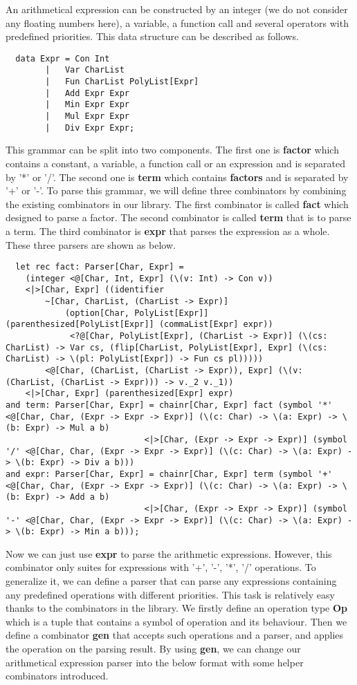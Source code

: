 An arithmetical expression can be constructed by an integer (we do not consider any floating numbers here), a variable, a function call and several operators with predefined priorities. This data structure can be described as follows.
\begin{lstlisting}
  data Expr = Con Int
		|	Var CharList
		|	Fun CharList PolyList[Expr]
		|	Add Expr Expr
		|	Min Expr Expr
		|	Mul Expr Expr
		|	Div Expr Expr;
\end{lstlisting}
This grammar can be split into two components. The first one is \textbf{factor} which contains a constant, a variable, a function call or an expression and is separated by '*' or '/'.  The second one is \textbf{term} which contains \textbf{factors} and is separated by '+' or '-'.
To parse this grammar, we will define three combinators by combining the existing combinators in our library. The first combinator is called \textbf{fact} which designed to parse a factor. The second combinator is called \textbf{term} that is to parse a term. The third combinator is \textbf{expr} that parses the expression as a whole. These three parsers are shown as below.
\begin{lstlisting}
  let rec fact: Parser[Char, Expr] =
	(integer <@[Char, Int, Expr] (\(v: Int) -> Con v))
	<|>[Char, Expr] ((identifier 
		~[Char, CharList, (CharList -> Expr)]
			(option[Char, PolyList[Expr]] (parenthesized[PolyList[Expr]] (commaList[Expr] expr))
			 <?@[Char, PolyList[Expr], (CharList -> Expr)] (\(cs: CharList) -> Var cs, (flip[CharList, PolyList[Expr], Expr] (\(cs: CharList) -> \(pl: PolyList[Expr]) -> Fun cs pl)))))
		<@[Char, (CharList, (CharList -> Expr)), Expr] (\(v: (CharList, (CharList -> Expr))) -> v._2 v._1))
	<|>[Char, Expr] (parenthesized[Expr] expr)
and term: Parser[Char, Expr] = chainr[Char, Expr] fact (symbol '*' <@[Char, Char, (Expr -> Expr -> Expr)] (\(c: Char) -> \(a: Expr) -> \(b: Expr) -> Mul a b)
							<|>[Char, (Expr -> Expr -> Expr)] (symbol '/' <@[Char, Char, (Expr -> Expr -> Expr)] (\(c: Char) -> \(a: Expr) -> \(b: Expr) -> Div a b)))
and expr: Parser[Char, Expr] = chainr[Char, Expr] term (symbol '+' <@[Char, Char, (Expr -> Expr -> Expr)] (\(c: Char) -> \(a: Expr) -> \(b: Expr) -> Add a b)
							<|>[Char, (Expr -> Expr -> Expr)] (symbol '-' <@[Char, Char, (Expr -> Expr -> Expr)] (\(c: Char) -> \(a: Expr) -> \(b: Expr) -> Min a b)));
\end{lstlisting}
Now we can just use \textbf{expr} to parse the arithmetic expressions. However, this combinator only suites for expressions with '+', '-', '*', '/' operations. To generalize it, we can define a parser that can parse any expressions containing any predefined operations with different priorities. This task is relatively easy thanks to the combinators in the library. We firstly define an operation type \textbf{Op} which is a tuple that contains a symbol of operation and its behaviour. Then we define a combinator \textbf{gen} that accepts such operations and a parser, and applies the operation on the parsing result. By using \textbf{gen}, we can change our arithmetical expression parser into the below format with some helper combinators introduced.

